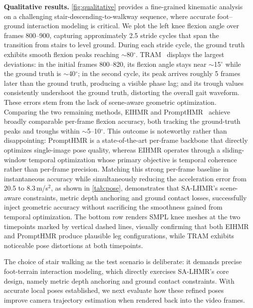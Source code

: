 \noindent\textbf{Qualitative results.}
\cref{fig:qualitative} provides a fine-grained kinematic analysis on a challenging stair-descending-to-walkway sequence, where accurate foot--ground interaction modeling is critical. We plot the left knee flexion angle over frames 800--900, capturing approximately 2.5 stride cycles that span the transition from stairs to level ground. During each stride cycle, the ground truth exhibits smooth flexion peaks reaching $\sim$80$^\circ$. TRAM~\cite{TRAM2024} displays the largest deviations: in the initial frames 800--820, its flexion angle stays near $\sim$15$^\circ$ while the ground truth is $\sim$40$^\circ$; in the second cycle, its peak arrives roughly 5 frames later than the ground truth, producing a visible phase lag; and its trough values consistently undershoot the ground truth, distorting the overall gait waveform. These errors stem from the lack of scene-aware geometric optimization. Comparing the two remaining methods, EIHMR and PromptHMR~\cite{PromptHMR2024} achieve broadly comparable per-frame flexion accuracy, both tracking the ground-truth peaks and troughs within $\sim$5--10$^\circ$. This outcome is noteworthy rather than disappointing: PromptHMR is a state-of-the-art per-frame backbone that directly optimizes single-image pose quality, whereas EIHMR operates through a sliding-window temporal optimization whose primary objective is temporal coherence rather than per-frame precision. Matching this strong per-frame baseline in instantaneous accuracy while simultaneously reducing the acceleration error from 20.5 to 8.3\,m/s$^2$, as shown in \cref{tab:pose}, demonstrates that SA-LHMR's scene-aware constraints, metric depth anchoring and ground contact losses, successfully inject geometric accuracy without sacrificing the smoothness gained from temporal optimization. The bottom row renders SMPL knee meshes at the two timepoints marked by vertical dashed lines, visually confirming that both EIHMR and PromptHMR produce plausible leg configurations, while TRAM exhibits noticeable pose distortions at both timepoints.

The choice of stair walking as the test scenario is deliberate: it demands precise foot-terrain interaction modeling, which directly exercises SA-LHMR's core design, namely metric depth anchoring and ground contact constraints. With accurate local poses established, we next evaluate how these refined poses improve camera trajectory estimation when rendered back into the video frames.


